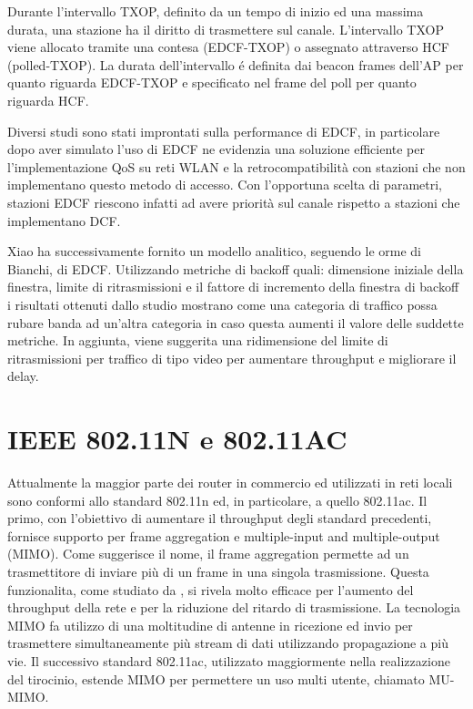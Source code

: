 Durante l'intervallo TXOP, definito da un tempo di inizio ed una massima durata, una stazione ha il diritto di trasmettere sul canale.
L'intervallo TXOP viene allocato tramite una contesa (EDCF-TXOP) o assegnato attraverso HCF (polled-TXOP).
La durata dell'intervallo \'e definita dai beacon frames dell'AP per quanto riguarda EDCF-TXOP e specificato nel frame del poll per quanto riguarda HCF.

Diversi studi sono stati improntati sulla performance di EDCF, in particolare \cite{mangold2002ieee} dopo aver simulato l'uso di EDCF ne evidenzia una soluzione efficiente per l'implementazione QoS su reti WLAN e la retrocompatibilit\`a con stazioni che non implementano questo metodo di accesso.
Con l'opportuna scelta di parametri, stazioni EDCF riescono infatti ad avere priorit\`a sul canale rispetto a stazioni che implementano DCF.

Xiao \cite{xiao2004performance} ha successivamente fornito un modello analitico, seguendo le orme di Bianchi, di EDCF.
Utilizzando metriche di backoff quali: dimensione iniziale della finestra, limite di ritrasmissioni e il fattore di incremento della finestra di backoff i risultati ottenuti dallo studio mostrano come una categoria di traffico possa rubare banda ad un'altra categoria in caso questa aumenti il valore delle suddette metriche.
In aggiunta, viene suggerita una ridimensione del limite di ritrasmissioni per traffico di tipo video per aumentare throughput e migliorare il delay.

\newpage


\section{IEEE 802.11N e 802.11AC}

Attualmente la maggior parte dei router in commercio ed utilizzati in reti locali sono conformi allo standard 802.11n ed, in particolare, a quello 802.11ac.
Il primo, con l'obiettivo di aumentare il throughput degli standard precedenti, fornisce supporto per frame aggregation e multiple-input and multiple-output (MIMO).
Come suggerisce il nome, il frame aggregation permette ad un trasmettitore di inviare pi\`u di un frame in una singola trasmissione.
Questa funzionalita, come studiato da  \cite{skordoulis2008ieee}, si rivela molto efficace per l'aumento del throughput della rete e per la riduzione del ritardo di trasmissione.
La tecnologia MIMO fa utilizzo di una moltitudine di antenne in ricezione ed invio per trasmettere simultaneamente pi\`u stream di dati utilizzando propagazione a pi\`u vie.
Il successivo standard 802.11ac, utilizzato maggiormente nella realizzazione del tirocinio, estende MIMO per permettere un uso multi utente, chiamato  MU-MIMO.

